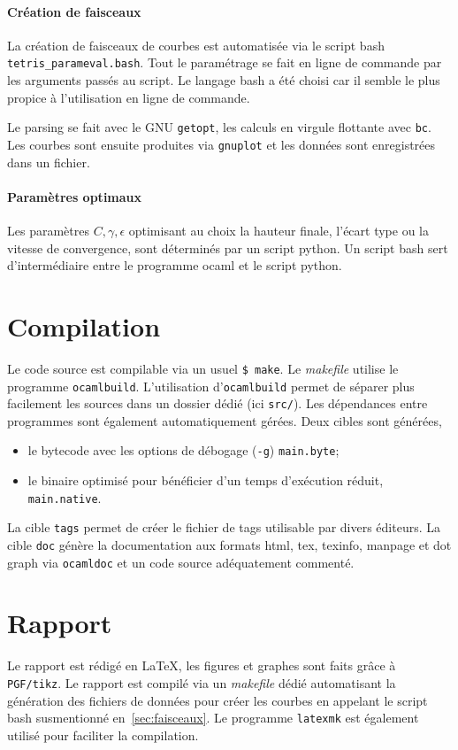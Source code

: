 \documentclass{report}
\begin{document}
\paragraph{Création de faisceaux}
La création de faisceaux de courbes est automatisée via le script bash
\texttt{tetris\_parameval.bash}. Tout le paramétrage se fait en ligne de commande
par les arguments passés au script. Le langage bash a été choisi car il semble
le plus propice à l'utilisation en ligne de commande.

Le parsing se fait avec le GNU \texttt{getopt}, les calculs en virgule flottante
avec \texttt{bc}. Les courbes sont ensuite produites via \texttt{gnuplot} et
les données sont enregistrées dans un fichier.

\paragraph{Paramètres optimaux}
Les paramètres \(C, \gamma, \epsilon\) optimisant au choix la hauteur
finale, l'écart type ou la vitesse de convergence, sont déterminés par un script
python. Un script bash sert d'intermédiaire entre le programme ocaml et le
script python.



\section{Compilation}
Le code source est compilable via un usuel \texttt{\$ make}. Le
\textit{makefile} utilise le programme \texttt{ocamlbuild}. L'utilisation
d'\texttt{ocamlbuild} permet de séparer plus facilement les sources dans un
dossier dédié (ici \texttt{src/}). Les dépendances entre programmes sont
également automatiquement gérées. Deux cibles sont générées,
\begin{itemize}
  \item le bytecode avec les options de débogage (\texttt{-g})
    \texttt{main.byte};
  \item le binaire optimisé pour bénéficier d'un temps d'exécution réduit,
    \texttt{main.native}.
\end{itemize}

La cible
\texttt{tags} permet de créer le fichier de tags utilisable par divers éditeurs.
La cible \texttt{doc} génère la documentation aux formats html, tex, texinfo,
manpage et dot graph via \texttt{ocamldoc} et un code source adéquatement
commenté.




\section{Rapport}
Le rapport est rédigé en \LaTeX{}, les figures et graphes sont faits grâce à
\texttt{PGF/tikz}. Le rapport est compilé via un \textit{makefile} dédié
automatisant la génération des fichiers de données pour créer les courbes en
appelant le script bash susmentionné en~\ref{sec:faisceaux}. Le
programme \texttt{latexmk} est également utilisé pour faciliter la compilation.
\end{document}
